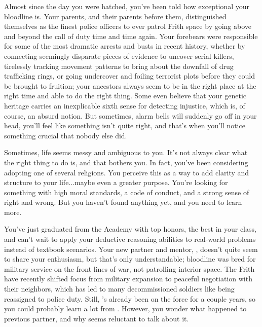 \documentclass[char]{guildcamp4}
\begin{document}
\name{\cCgood{}}

Almost since the day you were hatched, you've been told how exceptional your bloodline is. Your parents, and their parents before them, distinguished themselves as the finest police officers to ever patrol Frith space by going above and beyond the call of duty time and time again. Your forebears were responsible for some of the most dramatic arrests and busts in recent history, whether by connecting seemingly disparate pieces of evidence to uncover serial killers, tirelessly tracking movement patterns to bring about the downfall of drug trafficking rings, or going undercover and foiling terrorist plots before they could be brought to fruition; your ancestors always seem to be in the right place at the right time and able to do the right thing. Some even believe that your genetic heritage carries an inexplicable sixth sense for detecting injustice, which is, of course, an absurd notion. But sometimes, alarm bells will suddenly go off in your head, you'll feel like something isn't quite right, and that's when you'll notice something crucial that nobody else did. 

Sometimes, life seems messy and ambiguous to you. It's not always clear what the right thing to do is, and that bothers you. In fact, you've been considering adopting one of several religions. You perceive this as a way to add clarity and structure to your life...maybe even a greater purpose. You're looking for something with high moral standards, a code of conduct, and a strong sense of right and wrong. But you haven't found anything yet, and you need to learn more.

You've just graduated from the Academy with top honors, the best in your class, and can't wait to apply your deductive reasoning abilities to real-world problems instead of textbook scenarios. Your new partner and mentor, \cCbad{}, doesn't quite seem to share your enthusiasm, but that's only understandable; \cCbad{\their} bloodline was bred for military service on the front lines of war, not patrolling interior space. The Frith have recently shifted focus from military expansion to peaceful negotiation with their neighbors, which has led to many decommissioned soldiers like \cCbad{} being reassigned to police duty. Still, \cCbad{\they}'s already been on the force for a couple years, so you could probably learn a lot from \cCbad{\them}. However, you wonder what happened to \cCbad{\their} previous partner, and why \cCbad{\they} seems reluctant to talk about it.
\end{document}
